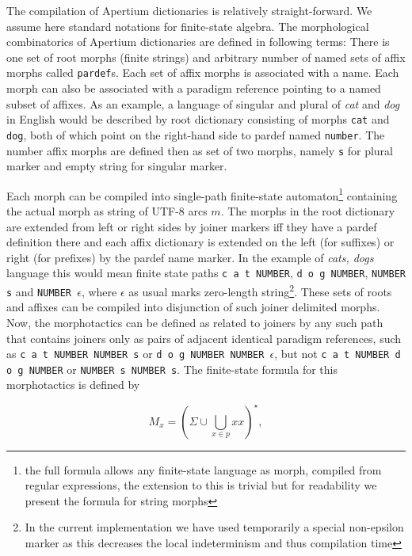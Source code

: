 \documentclass[10pt,a4paper]{article}
\begin{document}
The compilation of Apertium dictionaries is relatively straight-forward. We
assume here standard notations for finite-state algebra. The morphological
combinatorics of Apertium dictionaries are defined in following terms: There is
one set of root morphs (finite strings) and arbitrary number of named sets of
affix morphs called {\tt pardef}s. Each set of affix morphs is associated with a
name. Each morph can also be associated with a paradigm reference pointing to a
named subset of affixes. As an example, a language of singular and plural of
\emph{cat} and \emph{dog} in English would be described by root dictionary
consisting of morphs \texttt{cat} and \texttt{dog}, both of which point on the
right-hand side to pardef named \texttt{number}. The number affix morphs are
defined then as set of two morphs, namely \texttt{s} for plural marker and
empty string for singular marker.

Each morph can be compiled into single-path finite-state automaton\footnote{the
full formula allows any finite-state language as morph, compiled from regular
expressions, the extension to this is trivial but for readability we present
the formula for string morphs} containing the actual morph as string of UTF-8
arcs $m$. The morphs in the root dictionary are extended from left or right
sides by joiner markers iff they have a pardef definition there and each affix
dictionary is extended on the left (for suffixes) or right (for prefixes) by
the pardef name marker. In the example of \emph{cats, dogs} language this would
mean finite state paths \texttt{c a t NUMBER}, \texttt{d o g NUMBER},
\texttt{NUMBER s} and \texttt{NUMBER $\epsilon$}, where $\epsilon$ as usual
marks zero-length string\footnote{In the current implementation we have used
temporarily a special non-epsilon marker as this decreases the local
indeterminism and thus compilation time}.  These sets of roots and affixes can
be compiled into disjunction of such joiner delimited morphs.  Now, the
morphotactics can be defined as related to joiners by any such path that
contains joiners only as pairs of adjacent identical paradigm references, such
as \texttt{c a t NUMBER NUMBER s} or \texttt{d o g NUMBER NUMBER $\epsilon$},
but not \texttt{c a t NUMBER d o g NUMBER} or \texttt{NUMBER s NUMBER s}. The
finite-state formula for this morphotactics is defined by

\begin{equation}\label{formula:morphotax}
 M_x = (\Sigma \cup \bigcup_{x \in p} x x)^{\star},
\end{equation}
\end{document}

